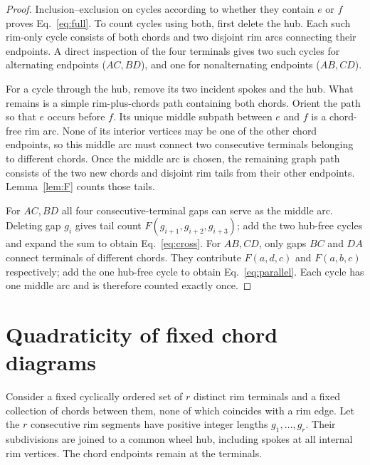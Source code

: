 \documentclass[9pt,a4paper,twocolumn]{extarticle}
\begin{document}
\begin{proof}
Inclusion--exclusion on cycles according to whether they contain $e$ or $f$ proves Eq.~\eqref{eq:full}. To count cycles using both, first delete the hub. Each such rim-only cycle consists of both chords and two disjoint rim arcs connecting their endpoints. A direct inspection of the four terminals gives two such cycles for alternating endpoints ($AC,BD$), and one for nonalternating endpoints ($AB,CD$).

For a cycle through the hub, remove its two incident spokes and the hub. What remains is a simple rim-plus-chords path containing both chords. Orient the path so that $e$ occurs before $f$. Its unique middle subpath between $e$ and $f$ is a chord-free rim arc. None of its interior vertices may be one of the other chord endpoints, so this middle arc must connect two consecutive terminals belonging to different chords. Once the middle arc is chosen, the remaining graph path consists of the two new chords and disjoint rim tails from their other endpoints. Lemma~\ref{lem:F} counts those tails.

For $AC,BD$ all four consecutive-terminal gaps can serve as the middle arc. Deleting gap $g_i$ gives tail count $F(g_{i+1},g_{i+2},g_{i+3})$; add the two hub-free cycles and expand the sum to obtain Eq.~\eqref{eq:cross}. For $AB,CD$, only gaps $BC$ and $DA$ connect terminals of different chords. They contribute $F(a,d,c)$ and $F(a,b,c)$ respectively; add the one hub-free cycle to obtain Eq.~\eqref{eq:parallel}. Each cycle has one middle arc and is therefore counted exactly once.
\end{proof}

\section{Quadraticity of fixed chord diagrams}
Consider a fixed cyclically ordered set of $r$ distinct rim terminals and a fixed collection of chords between them, none of which coincides with a rim edge. Let the $r$ consecutive rim segments have positive integer lengths $g_1,\ldots,g_r$. Their subdivisions are joined to a common wheel hub, including spokes at all internal rim vertices. The chord endpoints remain at the terminals.
\end{document}
